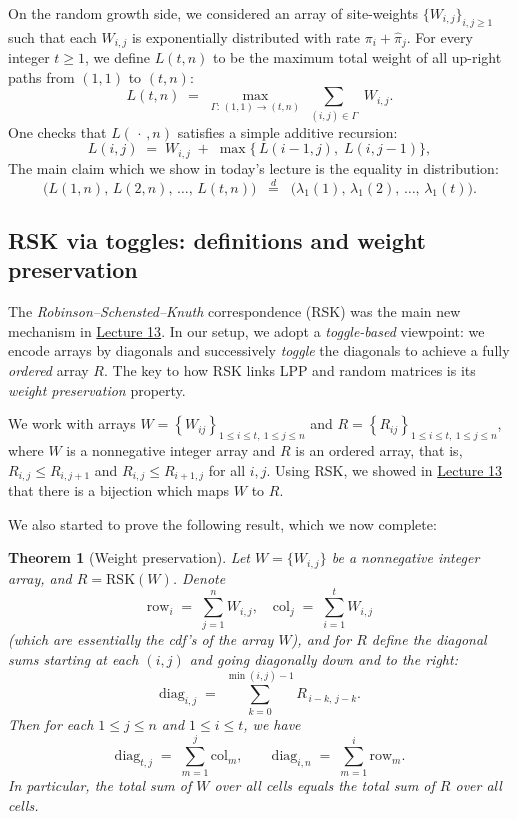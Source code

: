 \documentclass[letterpaper,11pt,oneside,reqno]{article}
\numberwithin{equation}{section}
\newtheorem{theorem}[proposition]{Theorem}
\theoremstyle{definition}
\begin{document}
On the random growth side, we considered an array of
site-weights $\{W_{i,j}\}_{i,j\ge1}$ such that each
$W_{i,j}$ is exponentially distributed with rate $\pi_i +
\hat\pi_j$.  For every integer $t\ge1$, we define $L(t,n)$
to be the maximum total weight of all up-right paths from
$(1,1)$ to $(t,n)$:
\[
L(t,n)\;=\;\max_{\Gamma:\,(1,1)\to(t,n)} \;\sum_{(i,j)\in\Gamma}\; W_{i,j}.
\]
One checks that $L(\,\cdot\,,n)$ satisfies a simple additive recursion:
\[
L(i,j)
\;=\;
W_{i,j}\;+\;\max\bigl\{\,L(i-1,j),\;L(i,j-1)\bigr\},
\]
The main claim which we show in today's lecture is the equality in distribution:
\begin{equation}
	\label{eq:main-claim}
\bigl(L(1,n),\,L(2,n),\,\dots,\,L(t,n)\bigr)
\;\;\stackrel{d}{=}\;\;
\bigl(\lambda_1(1),\,\lambda_1(2),\,\dots,\,\lambda_1(t)\bigr).
\end{equation}

\subsection{RSK via toggles: definitions and weight preservation}

The \emph{Robinson--Schensted--Knuth} correspondence (RSK) was the main new mechanism in
\href{https://lpetrov.cc/rmt25/rmt25-notes/rmt2025-l13.pdf}{Lecture 13}.
In our setup, we adopt a \emph{toggle-based} viewpoint: we
encode arrays by diagonals and successively \emph{toggle}
the diagonals to achieve a fully \emph{ordered} array $R$.
The key to how RSK links LPP and random matrices is its \emph{weight preservation} property.

We work with arrays $W=\left\{ W_{ij} \right\}_{1\le i\le t,\ 1\le j\le n}$
and $R=\left\{ R_{ij} \right\}_{1\le i\le t,\ 1\le j\le n}$,
where $W$ is a nonnegative integer array and $R$ is an ordered array, that is,
$R_{i,j}\le R_{i,j+1}$ and $R_{i,j}\le R_{i+1,j}$ for all $i,j$. Using RSK,
we showed in \href{https://lpetrov.cc/rmt25/rmt25-notes/rmt2025-l13.pdf}{Lecture 13} that
there is a bijection which maps $W$ to $R$.

We also started to prove the following result, which we now complete:

\begin{theorem}[Weight preservation]
\label{thm:WeightPreservationRecap}
Let $W=\{W_{i,j}\}$ be a nonnegative integer array, and $R=\mathrm{RSK}(W)$.  Denote
\[
\mathrm{row}_i \;=\; \sum_{j=1}^{n} W_{i,j},
\quad
\mathrm{col}_j \;=\; \sum_{i=1}^{t} W_{i,j}
\]
(which are essentially the cdf's of the array $W$\/),
and for $R$ define the diagonal sums starting at each $(i,j)$ and going diagonally down and to the right:
\[
\mathrm{diag}_{i,j}
\;=\;
\sum_{k=0}^{\min(i,j)-1} R_{\,i-k,\,j-k}.
\]
Then for each $1\le j\le n$ and $1\le i\le t$, we have
\begin{equation}
\label{eq:diagIdentityRecap}
\mathrm{diag}_{t,j}
\;=\;
\sum_{m=1}^{j}\mathrm{col}_{m},
\qquad
\mathrm{diag}_{i,n}
\;=\;
\sum_{m=1}^{i}\mathrm{row}_{m}.
\end{equation}
In particular,
the total sum of $W$ over all cells equals the total sum of $R$ over all cells.
\end{theorem}
\end{document}
